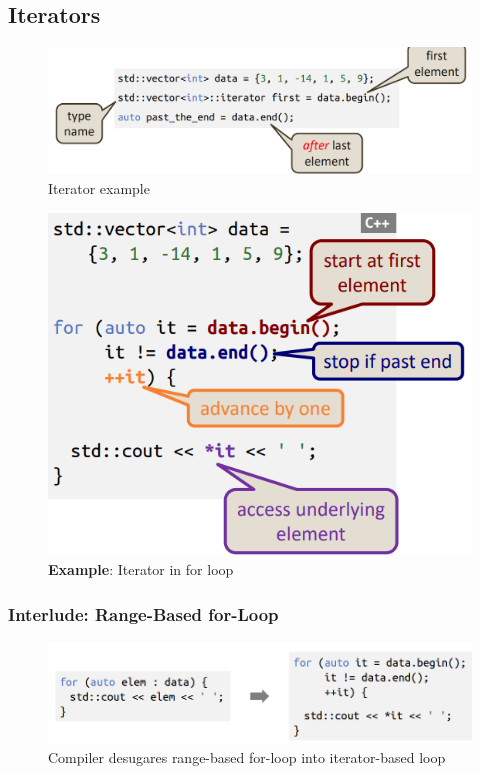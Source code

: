 \documentclass[a4paper,10pt]{article}
\begin{document}
\subsection{Iterators}
\begin{figure}[h!]
    \centering
    \includegraphics[width=1\linewidth]{e17.png}
    \caption{Iterator example}
    \label{fig:enter-label}
\end{figure}
\begin{figure}[h!]
    \centering
    \includegraphics[width=1\linewidth]{e18.png}
    \caption{\textbf{Example}: Iterator in for loop}
    \label{fig:enter-label}
\end{figure}
\subsubsection{Interlude: Range-Based for-Loop}
\begin{figure}[h]
    \centering
    \includegraphics[width=1\linewidth]{e19.png}
    \caption{Compiler desugares range-based for-loop into iterator-based loop}
    \label{fig:enter-label}
\end{figure}
\end{document}
